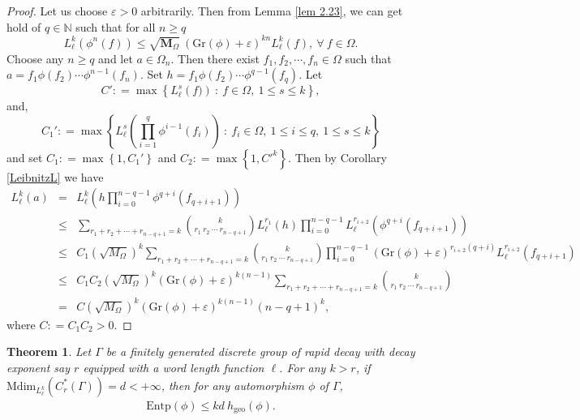 \documentclass[a4paper,11pt,reqno]{amsart}
\theoremstyle{plain}
\newtheorem{thm}{Theorem}[section]
\theoremstyle{mainthmstyle}
\theoremstyle{named}
\numberwithin{equation}{section}
\def\M{\boldsymbol M}
\newcommand{\Bea}{\begin{eqnarray*}}
\newcommand{\Eea}{\end{eqnarray*}}
\begin{document}
\begin{proof}
Let us choose $\varepsilon > 0$ arbitrarily. Then from Lemma \ref{lem 2.23}, we can get hold of $q \in \mathbb N$ such that for all $n \geq q$ 
\begin{displaymath}
    L^{k}_{\ell}(\phi^{n}(f))\leq \sqrt{\M_{\Omega}}\ (\mathrm{Gr}(\phi) + \varepsilon)^{kn}L^{k}_{\ell}(f), \ \forall \ f\in\Omega.
\end{displaymath}
Choose any $n \geq q$ and let $a \in \Omega_n.$ Then there exist $f_1, f_2, \cdots, f_n \in \Omega$ such that $a = f_1 \phi(f_2) \cdots \phi^{n - 1} (f_n).$ Set $h = f_1 \phi \left (f_2 \right ) \cdots \phi^{q - 1} \left (f_q \right ).$ Let $$C' : = \max \left \{L_{\ell}^{s} \left (f) \right )\ :\ f \in \Omega,\ 1 \leq s \leq k \right \},$$ and, $$C_1' : = \max \left \{L_{\ell}^{s} \left (\prod\limits_{i = 1}^{q} \phi^{i - 1} \left (f_i \right ) \right )\ :\ f_i \in \Omega,\ 1 \leq i \leq q,\ 1 \leq s \leq k \right \}$$ and set $C_1 : = \max \left \{1, C_1' \right \}$ and $C_2 : = \max \left \{1, {C'}^k \right \}.$ 
Then by Corollary \ref{LeibnitzL} we have 
\Bea
L_{\ell}^{k} (a) & = & L_{\ell}^{k} \left (h \prod\limits_{i = 0}^{n - q - 1} \phi^{q + i} (f_{q + i + 1}) \right ) \\ & \leq & \sum\limits_{r_1 + r_2 + \cdots + r_{n - q + 1} = k} \binom {k} {r_1\ r_2\ \cdots\ r_{n - q + 1}} L_{\ell}^{r_1} (h) \prod\limits_{i = 0}^{n - q - 1} L_{\ell}^{r_{i + 2}} \left (\phi^{q + i} (f_{q + i + 1}) \right ) \\ & \leq & C_1 \left (\sqrt {M_{\Omega}} \right )^{k} \sum\limits_{r_1 + r_2 + \cdots + r_{n - q + 1} = k} \binom {k} {r_1\ r_2\ \cdots\ r_{n - q + 1}} \prod\limits_{i = 0}^{n - q - 1} (\mathrm{Gr}(\phi) + \varepsilon)^{r_{i + 2} (q + i)} L_{\ell}^{r_{i + 2}} \left ( f_{q + i + 1} \right ) \\ & \leq & C_1 C_2 \left (\sqrt {M_{\Omega}} \right )^{k} (\mathrm{Gr}(\phi) + \varepsilon)^{k (n - 1)} \sum\limits_{r_1 + r_2 + \cdots + r_{n - q + 1} = k} \binom {k} {r_1\ r_2\ \cdots\ r_{n - q + 1}} \\ & = & C \left (\sqrt {M_{\Omega}} \right )^{k} (\mathrm{Gr}(\phi) + \varepsilon)^{k (n - 1)} (n - q + 1)^{k},
\Eea
where $C : = C_1 C_2 > 0.$
\end{proof}

\begin{thm}\label{upperbound}
    Let $\Gamma$ be a finitely generated discrete group of rapid decay with decay exponent say $r$ equipped with a word length function $\ell$. For any $k>r$, if $\mathrm{Mdim}_{L^{k}_{\ell}}(C^{\ast}_{r}(\Gamma))=d<+\infty$, then for any automorphism $\phi$ of $\Gamma$, 
    \begin{align*}
        \mathrm{Entp}(\phi)\leq kd\ h_{\mathrm{geo}}(\phi).
    \end{align*}
\end{thm}
\end{document}
